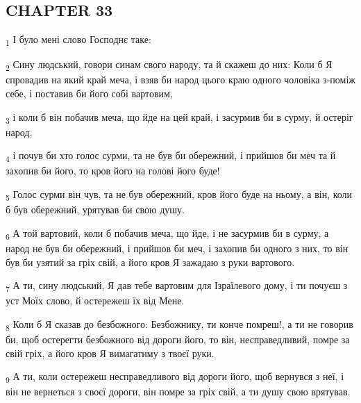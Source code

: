 \subsection{CHAPTER 33}
\begin{tcolorbox}
\textsubscript{1} І було мені слово Господнє таке:
\end{tcolorbox}
\begin{tcolorbox}
\textsubscript{2} Сину людський, говори синам свого народу, та й скажеш до них: Коли б Я спровадив на який край меча, і взяв би народ цього краю одного чоловіка з-поміж себе, і поставив би його собі вартовим,
\end{tcolorbox}
\begin{tcolorbox}
\textsubscript{3} і коли б він побачив меча, що йде на цей край, і засурмив би в сурму, й остеріг народ,
\end{tcolorbox}
\begin{tcolorbox}
\textsubscript{4} і почув би хто голос сурми, та не був би обережний, і прийшов би меч та й захопив би його, то кров його на голові його буде!
\end{tcolorbox}
\begin{tcolorbox}
\textsubscript{5} Голос сурми він чув, та не був обережний, кров його буде на ньому, а він, коли б був обережний, урятував би свою душу.
\end{tcolorbox}
\begin{tcolorbox}
\textsubscript{6} А той вартовий, коли б побачив меча, що йде, і не засурмив би в сурму, а народ не був би обережний, і прийшов би меч, і захопив би одного з них, то він був би узятий за гріх свій, а його кров Я зажадаю з руки вартового.
\end{tcolorbox}
\begin{tcolorbox}
\textsubscript{7} А ти, сину людський, Я дав тебе вартовим для Ізраїлевого дому, і ти почуєш з уст Моїх слово, й остережеш їх від Мене.
\end{tcolorbox}
\begin{tcolorbox}
\textsubscript{8} Коли б Я сказав до безбожного: Безбожнику, ти конче помреш!, а ти не говорив би, щоб остерегти безбожного від дороги його, то він, несправедливий, помре за свій гріх, а його кров Я вимагатиму з твоєї руки.
\end{tcolorbox}
\begin{tcolorbox}
\textsubscript{9} А ти, коли остережеш несправедливого від дороги його, щоб вернувся з неї, і він не вернеться з своєї дороги, він помре за гріх свій, а ти душу свою врятував.
\end{tcolorbox}
